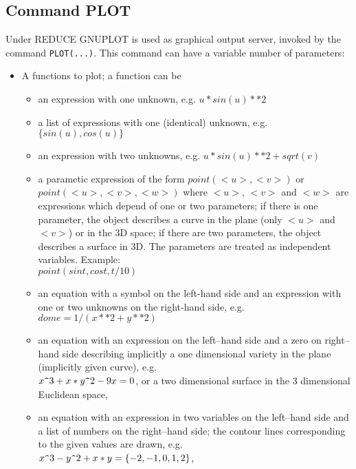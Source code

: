 \subsection{Command PLOT}

Under {\small REDUCE} GNUPLOT is used as graphical output
server, invoked by the command \verb+PLOT(...)+.
This command can have a variable number of
parameters:

\begin{itemize}
\item A functions to plot; a function can be
  \begin{itemize}
    \item an expression with one unknown, e.g. $u*sin(u)**2$

    \item a list of expressions with one (identical) unknown, 
          e.g. $\{sin(u),cos(u)\}$

    \item an expression with two unknowns, e.g. 
          $u*sin(u)**2+sqrt(v)$

    \item a parametic expression  of the form $point(<u>,<v>)$ or
          $point(<u>,<v>,<w>)$ where $<u>$, $<v>$ and $<w>$ are
          expressions which depend of one or two parameters;
          if there is one parameter, the object describes a curve
          in the plane (only $<u>$ and $<v>$) or in the 3D space;
          if there are two parameters, the object describes a
          surface in 3D. The parameters are treated as independent
          variables. Example:\\
                $ point(sin t,cos t,t/10)$

    \item an equation with a symbol on the left-hand side
         and an expression with one or two unknowns on the
         right-hand side, e.g.\\ $dome=1/(x**2+y**2)$

    \item an equation with an expression on the 
         left--hand side and a zero on right--hand side
         describing implicitly a one dimensional 
         variety in the plane (implicitly given curve), e.g.
            \\ $x{\verb+^+}3 + x*y{\verb+^+}2 -9x = 0$, or a two dimensional
         surface in the 3 dimensional Euclidean space,

    \item an equation with an expression in two variables on the 
         left--hand side and a list of numbers on the 
         right--hand side; the contour lines corresponding
         to the given values are drawn, e.g.
            \\ $x{\verb+^+}3 - y{\verb+^+}2 + x*y= \{-2,-1,0,1,2\}$,


\end{itemize}
\end{itemize}
